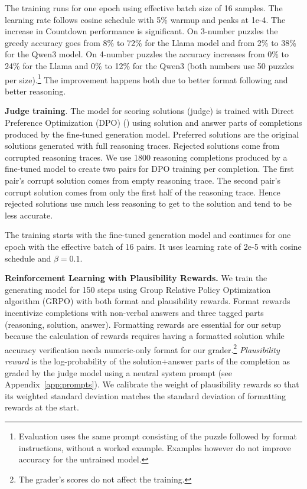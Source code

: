 \documentclass[12pt,a4paper]{article}
\begin{document}
The training runs for one epoch using effective batch size of 16 samples. The learning rate follows cosine schedule with 5\% warmup and peaks at  1e-4. The increase in Countdown performance is significant. On 3-number puzzles the greedy accuracy goes from 8\% to 72\% for the Llama model and from 2\% to 38\% for the Qwen3 model. On 4-number puzzles the accuracy increases from 0\% to 24\% for the Llama and 0\% to 12\% for the Qwen3  (both numbers use 50 puzzles per size).\footnote{Evaluation uses the same prompt consisting of the puzzle followed by format instructions, without a worked example. Examples however do not improve accuracy for the untrained model.} The improvement happens both due to better format following and better reasoning.



\textbf{Judge training}.  The model for scoring solutions (judge) is trained with Direct Preference Optimization (DPO) (\citet{rafailov_direct_2024}) using solution and answer parts of completions  produced by the fine-tuned generation model. Preferred solutions are the original solutions generated with full reasoning traces.  Rejected solutions come from corrupted reasoning traces. We use 1800 reasoning completions produced by a fine-tuned model to create two pairs for DPO training per completion. The first pair's corrupt solution comes from empty reasoning trace. The second pair's corrupt solution comes from only the first half of the reasoning trace.  Hence rejected solutions use much less reasoning to get to the solution and tend to be less accurate.

The training starts with the fine-tuned generation model and continues for one epoch with the effective batch of 16 pairs. It uses learning rate of 2e-5 with cosine schedule and $\beta=0.1$.



\textbf{Reinforcement Learning with Plausibility Rewards.} We train the generating model for 150 steps using Group Relative Policy Optimization algorithm (GRPO) with both format and plausibility rewards. Format rewards incentivize completions with non-verbal answers and three tagged parts (reasoning, solution, answer). Formatting rewards are essential for our setup because the calculation of rewards requires having a formatted solution while accuracy verification needs numeric-only format for our grader.\footnote{The grader's scores do not affect the training.} \textit{Plausibility reward} is the log-probability of the solution+answer parts of the completion as graded by the judge model using a neutral system prompt (see Appendix~\ref{app:prompts}). We calibrate the weight of plausibility rewards so that its weighted standard deviation matches the standard deviation of formatting rewards at the start.
\end{document}
